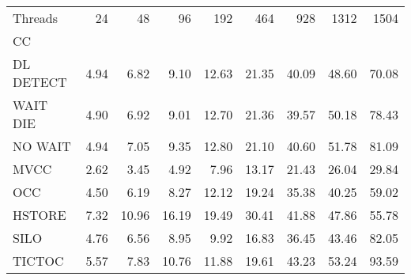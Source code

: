 \begin{tabular}{lrrrrrrrr}
\toprule
Threads &  24   &  48   &  96   &  192  &  464  &  928  &  1312 &  1504 \\
CC        &       &       &       &       &       &       &       &       \\
\midrule
DL DETECT &  4.94 &  6.82 &  9.10 & 12.63 & 21.35 & 40.09 & 48.60 & 70.08 \\
WAIT DIE  &  4.90 &  6.92 &  9.01 & 12.70 & 21.36 & 39.57 & 50.18 & 78.43 \\
NO WAIT   &  4.94 &  7.05 &  9.35 & 12.80 & 21.10 & 40.60 & 51.78 & 81.09 \\
MVCC      &  2.62 &  3.45 &  4.92 &  7.96 & 13.17 & 21.43 & 26.04 & 29.84 \\
OCC       &  4.50 &  6.19 &  8.27 & 12.12 & 19.24 & 35.38 & 40.25 & 59.02 \\
HSTORE    &  7.32 & 10.96 & 16.19 & 19.49 & 30.41 & 41.88 & 47.86 & 55.78 \\
SILO      &  4.76 &  6.56 &  8.95 &  9.92 & 16.83 & 36.45 & 43.46 & 82.05 \\
TICTOC    &  5.57 &  7.83 & 10.76 & 11.88 & 19.61 & 43.23 & 53.24 & 93.59 \\
\bottomrule
\end{tabular}
